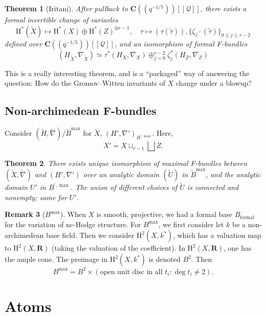 \documentclass[11pt, reqno]{amsart}
\numberwithin{equation}{section}
\theoremstyle{plain}
\newtheorem{theorem}{Theorem}[section]
\theoremstyle{definition}
\newtheorem{remark}[theorem]{Remark}
\theoremstyle{italicsname}
\newcommand{\cQ}{\mathcal{Q}}
\newcommand{\rH}{\mathrm{H}}
\newcommand{\bC}{\mathbf{C}}
\newcommand{\bR}{\mathbf{R}}
\begin{document}
\begin{theorem}[Iritani]
\label{thm:iritani}
    After pullback to $\bC((q^{-1/5}))[[\cQ]]$, there exists a formal invertible change of variavles
    \[
        \rH^*(\tilde X) \mapsto \rH^*(X) \oplus \rH^*(Z)^{\oplus r - 1}, \quad \tau \mapsto (\tau(\tilde \tau)), \{\zeta_j \cdot (\tilde \tau)\}_{0 \leq j \leq r - 2}
    \]
    defined over $\bC((q^{-1/5}))[[\cQ]]$, and an isomorphism of formal F-bundles
    \[
        (H_{\tilde X}, \nabla_{\tilde X}) \simeq \tau^*(H_X, \nabla_X) \oplus_{j = 0}^{r - 2} \zeta^*_j(H_Z, \nabla_Z)
    \]
\end{theorem}

This is a really interesting theorem, and is a ``packaged'' way of answering the question: How do the Gromov--Witten invariants of $X$ change under a blowup?

\subsection*{Non-archimedean F-bundles}

Consider $(\tilde H, \tilde \nabla)/\tilde B^{\max}$ for $\tilde X$, $(H', \nabla')_{B^{',\max}}$. Here,
\[
    X' = X \sqcup_{r - 1} \bigsqcup Z.
\]


\begin{theorem}
There exists unique isomorphism of maximal F-bundles between $(\tilde X, \tilde \nabla)$ and $(H', \nabla')$ over an analytic domain $(\tilde U)$ in $\tilde B^{\max}$, and the analytic domain $U'$ in $B^{',\max}$. The union of different choices of $\tilde U$ is connected and nonempty; same for $U'$.
\end{theorem}

\begin{remark}[$B^{\max}$]
    When $X$ is smooth, projective, we had a formal base $B_{\mathrm{formal}}$ for the variation of nc-Hodge structure. For $B^{\max}$, we first consider let $k$ be a non-archimedean base field. Then we consider $\rH^2(X, k^*)$, which has a valuation map to $\rH^2(X, \bR)$ (taking the valuation of the coefficient). In $\rH^2(X, \bR)$, one has the ample cone. The preimage in $\rH^2(X, k^*)$ is denoted $B^2$. Then 
    \[
    B^{\max} = B^2 \times (\textrm{open unit disc in all } t_i : \deg t_i \neq 2  ).
    \]
\end{remark}


\section{Atoms} %
\label{sec:atoms}
\end{document}
